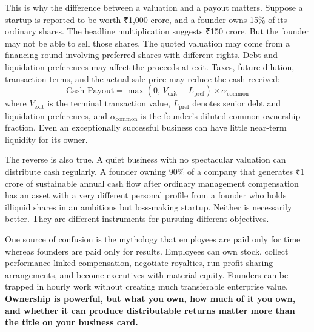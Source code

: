 This is why the difference between a valuation and a payout matters. Suppose a startup is reported to be worth ₹1,000 crore, and a founder owns 15\% of its ordinary shares. The headline multiplication suggests ₹150 crore. But the founder may not be able to sell those shares. The quoted valuation may come from a financing round involving preferred shares with different rights. Debt and liquidation preferences may affect the proceeds at exit. Taxes, future dilution, transaction terms, and the actual sale price may reduce the cash received:
\begin{equation}
  \text{Cash Payout} = \max\left(0, \, V_{\text{exit}} - L_{\text{pref}}\right) \times \alpha_{\text{common}} \label{eq:exit-proceeds}
\end{equation}
where $V_{\text{exit}}$ is the terminal transaction value, $L_{\text{pref}}$ denotes senior debt and liquidation preferences, and $\alpha_{\text{common}}$ is the founder's diluted common ownership fraction. Even an exceptionally successful business can have little near-term liquidity for its owner.

The reverse is also true. A quiet business with no spectacular valuation can distribute cash regularly. A founder owning 90\% of a company that generates ₹1 crore of sustainable annual cash flow after ordinary management compensation has an asset with a very different personal profile from a founder who holds illiquid shares in an ambitious but loss-making startup. Neither is necessarily better. They are different instruments for pursuing different objectives.

One source of confusion is the mythology that employees are paid only for time whereas founders are paid only for results. Employees can own stock, collect performance-linked compensation, negotiate royalties, run profit-sharing arrangements, and become executives with material equity. Founders can be trapped in hourly work without creating much transferable enterprise value. \textbf{Ownership is powerful, but what you own, how much of it you own, and whether it can produce distributable returns matter more than the title on your business card.}

